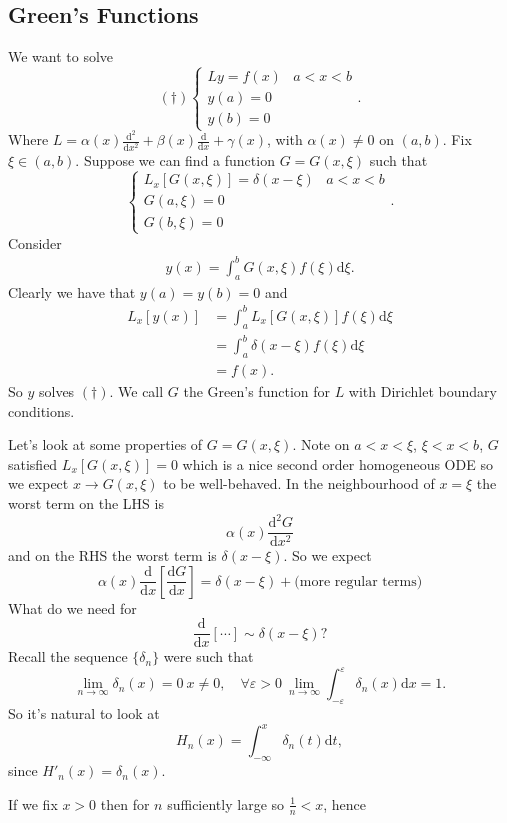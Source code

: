 \documentclass{article}
\begin{document}
\subsection{Green's Functions}
We want to solve
\[
	(\dagger)\begin{cases}
	  Ly=f(x) & a< x < b\\
	  y(a) = 0\\
	  y(b) = 0
  \end{cases}.
\]
Where $ L=\alpha(x)\frac{\mathrm d^2}{\mathrm dx^2}+\beta(x)\frac{\mathrm d}{\mathrm dx}+\gamma(x) $, with $ \alpha(x)\ne 0 $ on $ (a,b) $.
Fix $ \xi\in (a,b) $. Suppose we can find a function $ G=G(x,\xi) $ such that \[
  \begin{cases}
	  L_x[G(x,\xi)]=\delta(x-\xi) & a< x < b\\
	  G(a,\xi ) = 0\\
	  G(b,\xi ) = 0
  \end{cases}.
\]
Consider
\begin{align*}
	y(x)=\int_a^b G(x,\xi)f(\xi)\mathrm d\xi.
\end{align*}
Clearly we have that $ y(a)=y(b)=0 $ and
\begin{align*}
	L_x[y(x)]&=\int_a^bL_x[G(x,\xi)]f(\xi)\mathrm d\xi\\
		 &=\int_a^b\delta(x-\xi)f(\xi)\mathrm d\xi\\
		 &=f(x).
\end{align*}
So $ y $ solves $ (\dagger) $. We call $ G $ the Green's function for $ L $ with Dirichlet boundary conditions.\par
Let's look at some properties of $ G=G(x,\xi) $. Note on $ a<x<\xi $, $ \xi<x<b $, $ G $ satisfied $ L_x[G(x,\xi)]=0 $ which is a nice second order homogeneous ODE so we expect $ x\to G(x,\xi) $ to be well-behaved. In the neighbourhood of $ x=\xi $ the worst term on the LHS is
\[
	\alpha(x)\frac{\mathrm d^2 G}{\mathrm dx^2}
\]
and on the RHS the worst term is $ \delta(x-\xi) $. So we expect 
\[
	\alpha(x)\frac{\mathrm d}{\mathrm dx}\left[\frac{\mathrm d G}{\mathrm dx}\right]=\delta(x-\xi)+\text{(more regular terms)}
\]
What do we need for
\[
	\frac{\mathrm d}{\mathrm dx}\left[\cdots\right]\sim \delta(x-\xi)?
\]
Recall the sequence $ \{\delta_n\} $ were such that
\[
	\lim_{n\to \infty}\delta_n(x)=0\ x\ne 0,\quad \forall \varepsilon >0\ \lim_{n\to\infty}\int_{-\varepsilon}^\varepsilon \delta_n(x)\mathrm dx=1.
\]
So it's natural to look at
\[
	H_n(x)=\int_{-\infty}^x \delta_n(t)\mathrm dt,
\]
since $ H'_n(x)=\delta_n(x) $.\par
If we fix $ x>0 $ then for $ n $ sufficiently large so $ \frac1n < x $, hence
\end{document}
